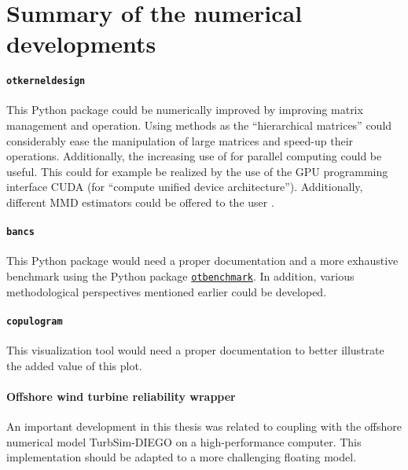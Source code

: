 \section*{Summary of the numerical developments}

\paragraph{\texttt{otkerneldesign}}
This Python package could be numerically improved by improving matrix management and operation. 
Using methods as the ``hierarchical matrices'' \citep{borm_2003_hmat} could considerably ease the manipulation of large matrices and speed-up their operations.  
Additionally, the increasing use of  for parallel computing could be useful. 
This could for example be realized by the use of the GPU programming interface CUDA (for ``compute unified device architecture''). 
Additionally, different MMD estimators could be offered to the user \citep{gretton_2006}. 


\paragraph{\texttt{bancs}}
This Python package would need a proper documentation and a more exhaustive benchmark using the Python package \href{https://github.com/mbaudin47/otbenchmark/}{\texttt{otbenchmark}}\footnotemark. 
In addition, various methodological perspectives mentioned earlier could be developed. 


\paragraph{\texttt{copulogram}}
This visualization tool would need a proper documentation to better illustrate the added value of this plot. 

\paragraph{Offshore wind turbine reliability wrapper}
An important development in this thesis was related to coupling \ot with the offshore numerical model TurbSim-DIEGO on a high-performance computer. 
This implementation should be adapted to a more challenging floating model.
